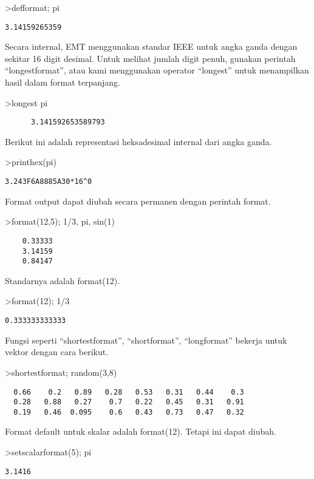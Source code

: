 \documentclass[
]{book}
\begin{document}
\textgreater defformat; pi

\begin{verbatim}
3.14159265359
\end{verbatim}

Secara internal, EMT menggunakan standar IEEE untuk angka ganda dengan sekitar 16 digit desimal. Untuk melihat jumlah digit penuh, gunakan perintah ``longestformat'', atau kami menggunakan operator ``longest'' untuk menampilkan hasil dalam format terpanjang.

\textgreater longest pi

\begin{verbatim}
      3.141592653589793 
\end{verbatim}

Berikut ini adalah representasi heksadesimal internal dari angka ganda.

\textgreater printhex(pi)

\begin{verbatim}
3.243F6A8885A30*16^0
\end{verbatim}

Format output dapat diubah secara permanen dengan perintah format.

\textgreater format(12,5); 1/3, pi, sin(1)

\begin{verbatim}
    0.33333 
    3.14159 
    0.84147 
\end{verbatim}

Standarnya adalah format(12).

\textgreater format(12); 1/3

\begin{verbatim}
0.333333333333
\end{verbatim}

Fungsi seperti ``shortestformat'', ``shortformat'', ``longformat'' bekerja untuk vektor dengan cara berikut.

\textgreater shortestformat; random(3,8)

\begin{verbatim}
  0.66    0.2   0.89   0.28   0.53   0.31   0.44    0.3 
  0.28   0.88   0.27    0.7   0.22   0.45   0.31   0.91 
  0.19   0.46  0.095    0.6   0.43   0.73   0.47   0.32 
\end{verbatim}

Format default untuk skalar adalah format(12). Tetapi ini dapat diubah.

\textgreater setscalarformat(5); pi

\begin{verbatim}
3.1416
\end{verbatim}
\end{document}
